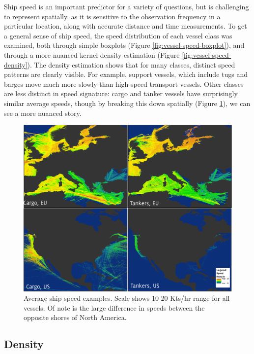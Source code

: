 Ship speed is an important predictor for a variety of questions, but is challenging to represent spatially, as it is sensitive to the observation frequency in a particular location, along with accurate distance and time measurements. To get a general sense of ship speed, the speed distribution of each vessel class was examined, both through simple boxplots (Figure \ref{fig:vessel-speed-boxplot}), and through a more nuanced kernel density estimation (Figure \ref{fig:vessel-speed-density}). The density estimation shows that for many classes, distinct speed patterns are clearly visible. For example, support vessels, which include tugs and barges move much more slowly than high-speed transport vessels. Other classes are less distinct in speed signature: cargo and tanker vessels have surprisingly similar average speeds, though by breaking this down spatially (Figure \ref{fig:speed-ship-map}), we can see a more nuanced story.
\begin{figure}
  \centerline{\includegraphics[width=160mm]{figures/speed_map_labeled.pdf}}
  \caption[Average ship speeds, North America and Europe]{Average ship speed examples. Scale shows 10-20 Kts/hr range for all vessels. Of note is the large difference in speeds between the opposite shores of North America.}
  \label{fig:speed-ship-map}
\end{figure}

\subsection{Density}

